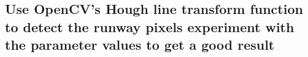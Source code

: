 \documentclass{article}
\begin{document}
\subsection{Use OpenCV’s Hough line transform function to detect the runway pixels
experiment with the parameter values to get a good result}
 \quad
{} \quad
\end{document}
